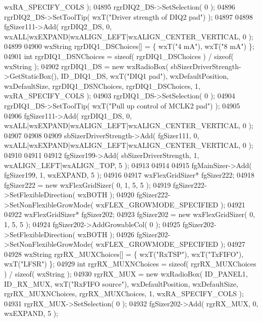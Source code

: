 \begin{DoxyCode}
      wxRA\_SPECIFY\_COLS );
04895     rgrDIQ2_DS->SetSelection( 0 );
04896     rgrDIQ2_DS->SetToolTip( wxT(\textcolor{stringliteral}{"Driver strength of DIQ2 pad"}) );
04897     
04898     fgSizer111->Add( rgrDIQ2_DS, 0, wxALL|wxEXPAND|wxALIGN\_LEFT|wxALIGN\_CENTER\_VERTICAL, 0 );
04899     
04900     wxString rgrDIQ1\_DSChoices[] = \{ wxT(\textcolor{stringliteral}{"4 mA"}), wxT(\textcolor{stringliteral}{"8 mA"}) \};
04901     \textcolor{keywordtype}{int} rgrDIQ1\_DSNChoices = \textcolor{keyword}{sizeof}( rgrDIQ1\_DSChoices ) / \textcolor{keyword}{sizeof}( wxString );
04902     rgrDIQ1_DS = \textcolor{keyword}{new} wxRadioBox( sbSizerDriverStrength->GetStaticBox(), 
      ID_DIQ1_DS, wxT(\textcolor{stringliteral}{"DIQ1 pad"}), wxDefaultPosition, wxDefaultSize, rgrDIQ1\_DSNChoices, rgrDIQ1\_DSChoices, 1, 
      wxRA\_SPECIFY\_COLS );
04903     rgrDIQ1_DS->SetSelection( 0 );
04904     rgrDIQ1_DS->SetToolTip( wxT(\textcolor{stringliteral}{"Pull up control of MCLK2 pad"}) );
04905     
04906     fgSizer111->Add( rgrDIQ1_DS, 0, wxALL|wxEXPAND|wxALIGN\_LEFT|wxALIGN\_CENTER\_VERTICAL, 0 );
04907     
04908     
04909     sbSizerDriverStrength->Add( fgSizer111, 0, wxALL|wxEXPAND|wxALIGN\_LEFT|wxALIGN\_CENTER\_VERTICAL, 0 );
04910     
04911     
04912     fgSizer199->Add( sbSizerDriverStrength, 1, wxALIGN\_LEFT|wxALIGN\_TOP, 5 );
04913     
04914     
04915     fgMainSizer->Add( fgSizer199, 1, wxEXPAND, 5 );
04916     
04917     wxFlexGridSizer* fgSizer222;
04918     fgSizer222 = \textcolor{keyword}{new} wxFlexGridSizer( 0, 1, 5, 5 );
04919     fgSizer222->SetFlexibleDirection( wxBOTH );
04920     fgSizer222->SetNonFlexibleGrowMode( wxFLEX\_GROWMODE\_SPECIFIED );
04921     
04922     wxFlexGridSizer* fgSizer202;
04923     fgSizer202 = \textcolor{keyword}{new} wxFlexGridSizer( 0, 1, 5, 5 );
04924     fgSizer202->AddGrowableCol( 0 );
04925     fgSizer202->SetFlexibleDirection( wxBOTH );
04926     fgSizer202->SetNonFlexibleGrowMode( wxFLEX\_GROWMODE\_SPECIFIED );
04927     
04928     wxString rgrRX\_MUXChoices[] = \{ wxT(\textcolor{stringliteral}{"RxTSP"}), wxT(\textcolor{stringliteral}{"TxFIFO"}), wxT(\textcolor{stringliteral}{"LFSR"}) \};
04929     \textcolor{keywordtype}{int} rgrRX\_MUXNChoices = \textcolor{keyword}{sizeof}( rgrRX\_MUXChoices ) / \textcolor{keyword}{sizeof}( wxString );
04930     rgrRX_MUX = \textcolor{keyword}{new} wxRadioBox( ID_PANEL1, ID_RX_MUX, wxT(\textcolor{stringliteral}{"RxFIFO source"}), wxDefaultPosition, 
      wxDefaultSize, rgrRX\_MUXNChoices, rgrRX\_MUXChoices, 1, wxRA\_SPECIFY\_COLS );
04931     rgrRX_MUX->SetSelection( 0 );
04932     fgSizer202->Add( rgrRX_MUX, 0, wxEXPAND, 5 );

\end{DoxyCode}
